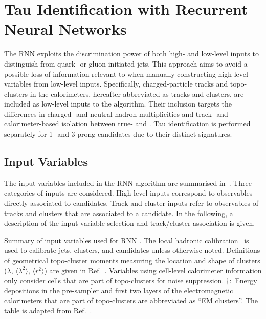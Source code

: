 \section{Tau Identification with Recurrent Neural Networks}%
\label{sec:tauid_rnn}

The RNN \tauid exploits the discrimination power of both high- and low-level
inputs to distinguish \tauhad from quark- or gluon-initiated jets. This approach
aims to avoid a possible loss of information relevant to \tauid when manually
constructing high-level variables from low-level inputs. Specifically,
charged-particle tracks and topo-clusters in the calorimeters, hereafter
abbreviated as tracks and clusters, are included as low-level inputs to the
algorithm. Their inclusion targets the differences in charged- and
neutral-hadron multiplicities and track- and calorimeter-based isolation between
true- and \faketauhadvis. Tau identification is performed separately for 1- and
3-prong \tauhadvis candidates due to their distinct signatures.


\subsection{Input Variables}

The input variables included in the RNN \tauid algorithm are summarised
in~. Three categories of inputs are
considered. High-level inputs correspond to observables directly associated to
\tauhadvis candidates. Track and cluster inputs refer to observables of tracks
and clusters that are associated to a \tauhadvis candidate. In the following, a
description of the input variable selection and track/cluster association is
given.

\begin{table}[htbp]
  \centering

  \caption{Summary of input variables used for RNN \tauid. The local
    hadronic calibration~\cite{PERF-2014-07} is used to calibrate
    jets, clusters, and \tauhadvis candidates unless otherwise
    noted. Definitions of geometrical topo-cluster moments measuring
    the location and shape of clusters ($\lambda$,
    $\langle \lambda^2 \rangle$, $\langle r^2 \rangle$) are given in
    Ref.~\cite{PERF-2014-07}. Variables using cell-level calorimeter
    information only consider cells that are part of topo-clusters for
    noise suppression. $\dagger$:~Energy depositions in the
    pre-sampler and first two layers of the electromagnetic
    calorimeters that are part of topo-clusters are abbreviated as ``EM
    clusters''. The table is adapted from
    Ref.~\cite{ATL-PHYS-PUB-2019-033}.}%
  \label{tab:tauid_input_variables}

  \resizebox{0.99\textwidth}{!}{
    
  }
\end{table}

